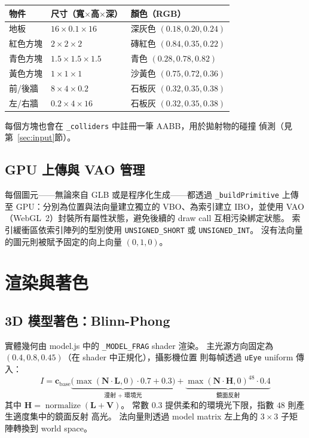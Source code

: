 \documentclass[a4paper, 12pt]{article}
\begin{document}
\begin{center}
\begin{tabular}{lll}
\toprule
\textbf{物件} & \textbf{尺寸（寬$\times$高$\times$深）} & \textbf{顏色（RGB）} \\
\midrule
地板             & $16\times0.1\times16$ & 深灰色 $(0.18,0.20,0.24)$ \\
紅色方塊         & $2\times2\times2$     & 磚紅色 $(0.84,0.35,0.22)$ \\
青色方塊         & $1.5\times1.5\times1.5$ & 青色 $(0.28,0.78,0.82)$ \\
黃色方塊         & $1\times1\times1$     & 沙黃色 $(0.75,0.72,0.36)$ \\
前/後牆          & $8\times4\times0.2$   & 石板灰 $(0.32,0.35,0.38)$ \\
左/右牆          & $0.2\times4\times16$  & 石板灰 $(0.32,0.35,0.38)$ \\
\bottomrule
\end{tabular}
\end{center}

每個方塊也會在 \texttt{\_colliders} 中註冊一筆 AABB，用於拋射物的碰撞
偵測（見第~\ref{sec:input}節）。

\subsection{GPU 上傳與 VAO 管理}

每個圖元——無論來自 GLB 或是程序化生成——都透過 \texttt{\_buildPrimitive}
上傳至 GPU：分別為位置與法向量建立獨立的 VBO、為索引建立 IBO，並使用
VAO（WebGL~2）封裝所有屬性狀態，避免後續的 draw call 互相污染綁定狀態。
索引緩衝區依索引陣列的型別使用 \texttt{UNSIGNED\_SHORT} 或
\texttt{UNSIGNED\_INT}。
沒有法向量的圖元則被賦予固定的向上向量 $(0,1,0)$。

\section{渲染與著色}

\subsection{3D 模型著色：Blinn-Phong}

實體幾何由 model.js 中的 \texttt{\_MODEL\_FRAG} shader 渲染。
主光源方向固定為 $(0.4,0.8,0.45)$（在 shader 中正規化），攝影機位置
則每幀透過 \texttt{uEye} uniform 傳入：
\[
  I = \mathbf{c}_{\text{base}}
      \underbrace{\bigl(\max(\mathbf{N}\cdot\mathbf{L},0)\cdot0.7+0.3\bigr)}_{\text{漫射 + 環境光}}
    + \underbrace{\max(\mathbf{N}\cdot\mathbf{H},0)^{48}\cdot0.4}_{\text{鏡面反射}}
\]
其中 $\mathbf{H}=\operatorname{normalize}(\mathbf{L}+\mathbf{V})$。
常數 $0.3$ 提供柔和的環境光下限，指數 $48$ 則產生適度集中的鏡面反射
高光。
法向量則透過 model matrix 左上角的 $3\times3$ 子矩陣轉換到 world space。
\end{document}
